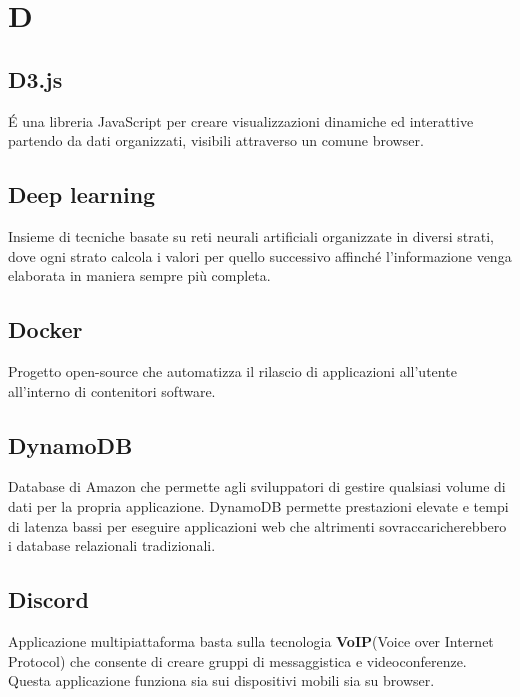 \section*{D}
\markright{}
\subsection*{D3.js}
\'E una libreria JavaScript per creare visualizzazioni dinamiche ed interattive partendo da dati organizzati, visibili attraverso un comune browser.
\subsection*{Deep learning}
Insieme di tecniche basate su reti neurali artificiali organizzate in diversi strati, dove ogni strato calcola i valori per quello successivo affinché l'informazione venga elaborata in maniera sempre più completa.
\subsection*{Docker}
Progetto open-source che automatizza il rilascio di applicazioni all'utente all'interno di contenitori software.
\subsection*{DynamoDB}
Database  di Amazon che permette agli sviluppatori di gestire qualsiasi volume di dati per la propria applicazione. DynamoDB permette prestazioni elevate e tempi di latenza bassi per eseguire applicazioni web che altrimenti sovraccaricherebbero i database relazionali tradizionali.

\subsection*{Discord}
Applicazione multipiattaforma basta sulla tecnologia \textbf{VoIP}(Voice over Internet Protocol) che consente di creare gruppi di messaggistica e videoconferenze. Questa applicazione funziona sia sui dispositivi mobili sia su browser.

